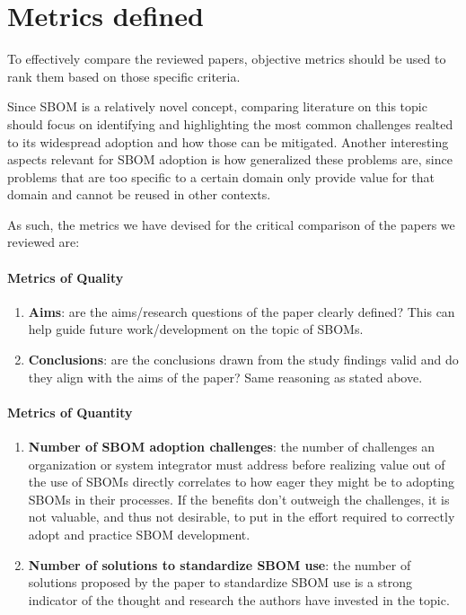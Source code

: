 \section{Metrics defined} \label{metrics}

To effectively compare the reviewed papers, objective metrics should be used to rank them based on those specific criteria.

\noindent Since SBOM is a relatively novel concept, comparing literature on this topic should focus on identifying and highlighting the most common challenges realted to its widespread adoption and how those can be mitigated. Another interesting aspects relevant for SBOM adoption is how generalized these problems are, since problems that are too specific to a certain domain only provide value for that domain and cannot be reused in other contexts.

\noindent As such, the metrics we have devised for the critical comparison of the papers we reviewed are:

\paragraph{Metrics of Quality}
\begin{enumerate}
    \item \textbf{Aims}: are the aims/research questions of the paper clearly defined? This can help guide future work/development on the topic of SBOMs.
    \item \textbf{Conclusions}: are the conclusions drawn from the study findings valid and do they align with the aims of the paper? Same reasoning as stated above.
          \setcounter{metrics}{\value{enumi}}
\end{enumerate}

\paragraph{Metrics of Quantity}
\begin{enumerate}
    \setcounter{enumi}{\value{metrics}}
    \item \textbf{Number of SBOM adoption challenges}: the number of challenges an organization or system integrator must address before realizing value out of the use of SBOMs directly correlates to how eager they might be to adopting SBOMs in their processes. If the benefits don't outweigh the challenges, it is not valuable, and thus not desirable, to put in the effort required to correctly adopt and practice SBOM development.
    \item \textbf{Number of solutions to standardize SBOM use}: the number of solutions proposed by the paper to standardize SBOM use is a strong indicator of the thought and research the authors have invested in the topic.
          \setcounter{metrics}{\value{enumi}}
\end{enumerate}

